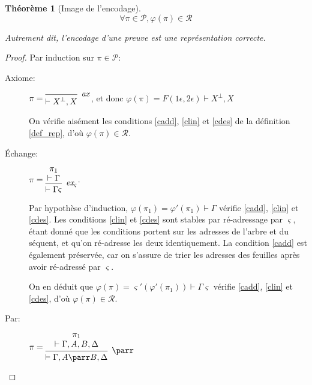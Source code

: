 \documentclass[11pt,a4paper]{article}
\theoremstyle{plain}
\newtheorem{theorem}{Théorème}
\theoremstyle{definition}
\theoremstyle{remark}
\newcommand*{\orth}{^\perp}
\newcommand*{\namedproofv}[2]{\hypo{#1}\infer[no rule]{1}{\vdash #2}}
\newcommand*{\axv}[1]{\infer{0}[\ensuremath{\mathit{ax}}]{\vdash #1}}
\newcommand*{\parrv}[1]{\infer{1}[\ensuremath{\parr}]{\vdash #1}}
\newcommand*{\permv}[2]{\infer{1}[\ensuremath{\textit{ex}_{#1}}]{\vdash #2}}
\newcommand*{\permapp}[2]{#2 #1}
\newcommand*{\someperm}{\varsigma}
\newcommand*{\someproof}{\pi}
\newcommand*{\sequent}{\Gamma}
\newcommand*{\proofs}{\ensuremath{\mathcal{P}}}
\newcommand*{\representations}{\ensuremath{\mathcal{R}}}
\newcommand*{\encode}{\ensuremath{\varphi}}
\begin{document}
\begin{theorem}[Image de l'encodage]
    \begin{equation*}
    \forall \someproof \in \proofs, \encode \left( \someproof \right) \in \representations
    \end{equation*}

    Autrement dit, l'encodage d'une preuve est une représentation correcte.
\end{theorem}

\begin{proof}
    Par induction sur $\someproof \in \proofs$:
    \begin{description}
    \item[Axiome:] $\someproof =
    \begin{prooftree}
        \axv{X\orth, X}
    \end{prooftree}$,
    et donc $\encode \left( \someproof \right) = F(1 \epsilon, 2 \epsilon) \vdash X\orth, X$

    On vérifie aisément les conditions \ref{cadd}, \ref{clin} et \ref{cdes} de la définition \ref{def_rep}, d'où $\encode \left( \someproof \right) \in \representations$.

    \item[Échange:] $\someproof =
    \begin{prooftree}
        \namedproofv{\pi_1}{\sequent}
        \permv{\someperm}{\permapp{\someperm}{\sequent}}
    \end{prooftree}$.
    
    Par hypothèse d'induction, $\encode \left( \pi_1 \right) = \encode ' \left( \pi_1 \right) \vdash \sequent$ vérifie \ref{cadd}, \ref{clin} et \ref{cdes}. Les conditions \ref{clin} et \ref{cdes} sont stables par ré-adressage par $\someperm$, étant donné que les conditions portent sur les adresses de l'arbre et du séquent, et qu'on ré-adresse les deux identiquement. La condition \ref{cadd} est également préservée, car on s'assure de trier les adresses des feuilles après avoir ré-adressé par $\someperm$.

    On en déduit que $\encode \left( \someproof \right) = \someperm' \left( \encode ' \left( \pi_1 \right) \right) \vdash \permapp{\someperm}{\sequent}$ vérifie \ref{cadd}, \ref{clin} et \ref{cdes}, d'où $\encode \left( \someproof \right) \in \representations$.

    \item[Par:] $\someproof =
    \begin{prooftree}
      \namedproofv{\pi_1}{\sequent, A, B, \Delta}
      \parrv{\sequent, A \parr B, \Delta}
    \end{prooftree}$


\end{description}
\end{proof}
\end{document}

